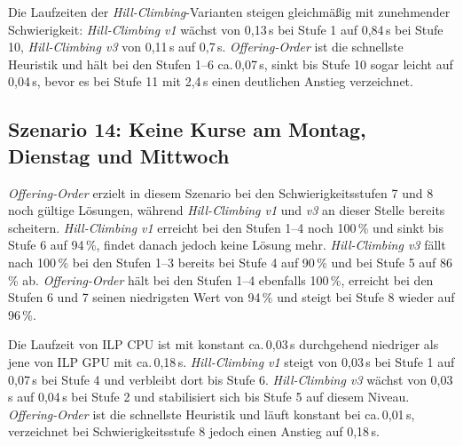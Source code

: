 \vspace{1cm}

\newpage

Die Laufzeiten der \textit{Hill-Climbing}-Varianten steigen gleichmäßig mit zunehmender
Schwierigkeit: \textit{Hill-Climbing v1} wächst von 0{,}13\,s bei Stufe 1 auf 0{,}84\,s bei
Stufe 10, \textit{Hill-Climbing v3} von 0{,}11\,s auf 0{,}7\,s. \textit{Offering-Order} ist
die schnellste Heuristik und hält bei den Stufen 1--6 ca.\,0{,}07\,s, sinkt bis Stufe 10
sogar leicht auf 0{,}04\,s, bevor es bei Stufe 11 mit 2{,}4\,s einen deutlichen Anstieg
verzeichnet.

\vspace{1cm}

\newpage


\subsection{Szenario 14: Keine Kurse am Montag, Dienstag und Mittwoch}

\textit{Offering-Order} erzielt in diesem Szenario bei den Schwierigkeitsstufen 7 und 8 noch
gültige Lösungen, während \textit{Hill-Climbing v1} und \textit{v3} an dieser Stelle bereits
scheitern. \textit{Hill-Climbing v1} erreicht bei den Stufen 1--4 noch 100\,\% und sinkt bis
Stufe 6 auf 94\,\%, findet danach jedoch keine Lösung mehr. \textit{Hill-Climbing v3} fällt
nach 100\,\% bei den Stufen 1--3 bereits bei Stufe 4 auf 90\,\% und bei Stufe 5 auf 86\,\% ab.
\textit{Offering-Order} hält bei den Stufen 1--4 ebenfalls 100\,\%, erreicht bei den Stufen
6 und 7 seinen niedrigsten Wert von 94\,\% und steigt bei Stufe 8 wieder auf 96\,\%.

\vspace{1cm}

\newpage

Die Laufzeit von ILP CPU ist mit konstant ca.\,0{,}03\,s durchgehend niedriger als jene von
ILP GPU mit ca.\,0{,}18\,s. \textit{Hill-Climbing v1} steigt von 0{,}03\,s bei Stufe 1 auf
0{,}07\,s bei Stufe 4 und verbleibt dort bis Stufe 6. \textit{Hill-Climbing v3} wächst von
0{,}03\,s auf 0{,}04\,s bei Stufe 2 und stabilisiert sich bis Stufe 5 auf diesem Niveau.
\textit{Offering-Order} ist die schnellste Heuristik und läuft konstant bei ca.\,0{,}01\,s,
verzeichnet bei Schwierigkeitsstufe 8 jedoch einen Anstieg auf 0{,}18\,s.

\vspace{1cm}

\newpage